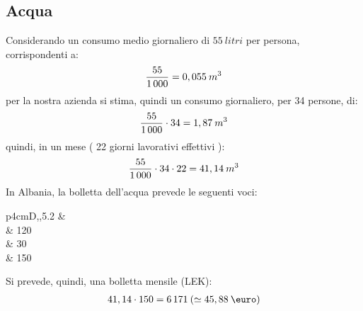 \subsection[Acqua]{Acqua}
Considerando un consumo medio giornaliero di $ 55 \: litri $ per persona, corrispondenti a:
	\begin{equation}
	\label{eq:consumo_acqua_giorno_dipendente}
	\begin{split}
		\frac{55}{1\thinspace 000} = 0,055 \: m^3
	\end{split}
	\end{equation}	
per la nostra azienda si stima, quindi un consumo giornaliero, per 34 persone, di:
	\begin{equation}
	\label{eq:consumo_acqua_giorno_azienda}
	\begin{split}
		\frac{55}{1\thinspace 000} \cdot 34 = 1,87 \: m^3
	\end{split}
	\end{equation}	
quindi, in un mese ( 22 giorni lavorativi effettivi ):	
	\begin{equation}
	\label{eq:consumo_acqua_giorno_azienda}
	\begin{split}
		\frac{55}{1\thinspace 000} \cdot 34 \cdot 22 = 41,14 \: m^3
	\end{split}
	\end{equation}	
In Albania, la bolletta dell'acqua prevede le seguenti voci:
\begin{savenotes}
\begin{table}[htb]
\centering
 \caption{Costo \si{m^3} acqua}
 \begin{tabular}{p{4cm}D{,}{,}{5.2}}
 \toprule
 	& \\
 \midrule
	 & 120\\
	 & 30\\
 \midrule
	 & 150\\	
 \bottomrule
 \end{tabular} 
\end{table}
\end{savenotes}
Si prevede, quindi, una bolletta mensile (LEK):
	\begin{equation}
	\label{eq:bolletta_acqua_azienda}
	\begin{split}
		41,14 \cdot 150 = 6\thinspace 171 \: ( \simeq 45,88 \: \mbox{\euro}) 
	\end{split}
	\end{equation}	
